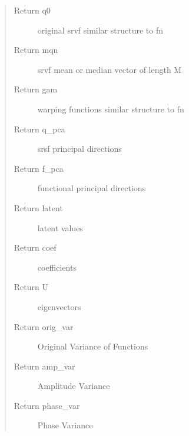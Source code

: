 \documentclass[letterpaper,10pt,english]{sphinxmanual}
\begin{document}
\begin{fulllineitems}
\begin{quote}
\begin{description}
\item[{Return q0}] \leavevmode
original srvf \sphinxhyphen{} similar structure to fn

\item[{Return mqn}] \leavevmode
srvf mean or median \sphinxhyphen{} vector of length M

\item[{Return gam}] \leavevmode
warping functions \sphinxhyphen{} similar structure to fn

\item[{Return q\_pca}] \leavevmode
srsf principal directions

\item[{Return f\_pca}] \leavevmode
functional principal directions

\item[{Return latent}] \leavevmode
latent values

\item[{Return coef}] \leavevmode
coefficients

\item[{Return U}] \leavevmode
eigenvectors

\item[{Return orig\_var}] \leavevmode
Original Variance of Functions

\item[{Return amp\_var}] \leavevmode
Amplitude Variance

\item[{Return phase\_var}] \leavevmode
Phase Variance

\end{description}\end{quote}

\end{fulllineitems}

\end{document}
